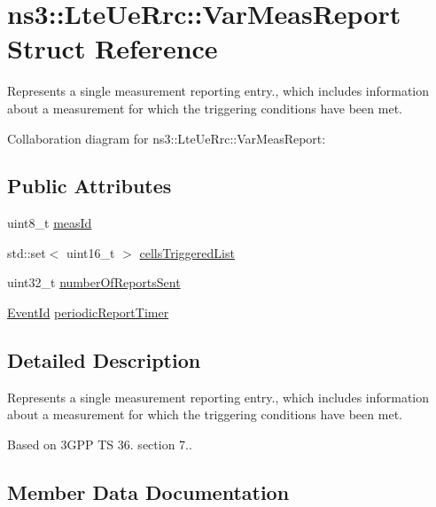 \hypertarget{structns3_1_1LteUeRrc_1_1VarMeasReport}{}\section{ns3\+:\+:Lte\+Ue\+Rrc\+:\+:Var\+Meas\+Report Struct Reference}
\label{structns3_1_1LteUeRrc_1_1VarMeasReport}


Represents a single measurement reporting entry., which includes information about a measurement for which the triggering conditions have been met.  




Collaboration diagram for ns3\+:\+:Lte\+Ue\+Rrc\+:\+:Var\+Meas\+Report\+:
\subsection*{Public Attributes}
\begin{DoxyCompactItemize}
\item 
uint8\+\_\+t \hyperlink{structns3_1_1LteUeRrc_1_1VarMeasReport_aaecd4fd0cc513ce3caa7704bd8366844}{meas\+Id}
\item 
std\+::set$<$ uint16\+\_\+t $>$ \hyperlink{structns3_1_1LteUeRrc_1_1VarMeasReport_a72b521209a7147a256ddbc5db6897e13}{cells\+Triggered\+List}
\item 
uint32\+\_\+t \hyperlink{structns3_1_1LteUeRrc_1_1VarMeasReport_a700ac90fcc3dea22e644cd9cc8fdaeb5}{number\+Of\+Reports\+Sent}
\item 
\hyperlink{classns3_1_1EventId}{Event\+Id} \hyperlink{structns3_1_1LteUeRrc_1_1VarMeasReport_aa84dd21a285a9467d430c3024516debf}{periodic\+Report\+Timer}
\end{DoxyCompactItemize}


\subsection{Detailed Description}
Represents a single measurement reporting entry., which includes information about a measurement for which the triggering conditions have been met. 

Based on 3\+G\+PP TS 36. section 7.. 

\subsection{Member Data Documentation}
